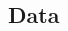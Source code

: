 \documentclass[a0,portrait]{a0poster}
\begin{document}
\begin{multicols}{2}

\section*{Data}

\end{multicols}
\end{document}
